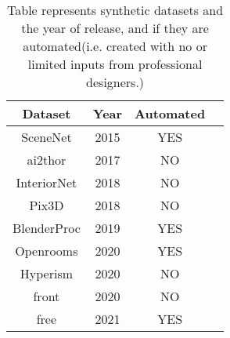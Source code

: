 \begin{table}[ht]
    \centering
    \begin{tabular}{|c |c |c |c|}
        \hline
        Dataset & Year & Automated \\ [0.5ex]
        \hline\hline
        SceneNet & 2015 & YES \\
        \hline
        \gls{ai2thor} & 2017 & NO \\
        \hline
        InteriorNet & 2018 & NO \\
        \hline
        Pix3D & 2018 & NO \\
        \hline
        BlenderProc & 2019 & YES \\
        \hline
        Openrooms & 2020 & YES \\
        \hline
        Hyperism & 2020 & NO \\
        \hline
        \gls{front} & 2020 & NO \\
        \hline
        \gls{free} & 2021 & YES \\[1ex]
        \hline
    \end{tabular}
    \caption[Synthetic Datasets]{Table represents synthetic datasets and the year of release, and if they are automated(i.e. created with no or limited inputs from professional designers.)}
    \label{tab:dataset_comparison}
\end{table}

